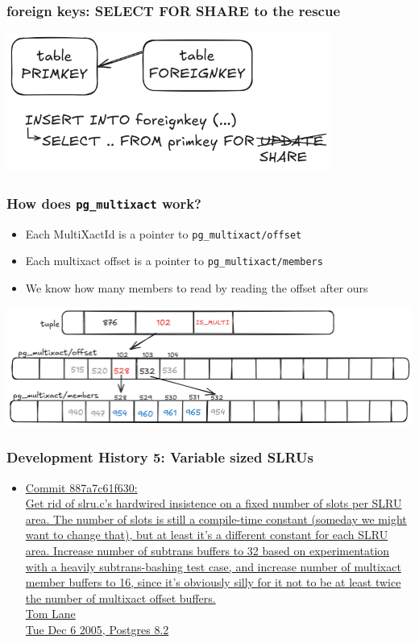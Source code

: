 \begin{frame}
  \frametitle{foreign keys: SELECT FOR SHARE to the rescue}
  \includegraphics[width=0.8\textwidth]{select-for-share.png}
\end{frame}

\begin{frame}
  \frametitle{How does \texttt{pg\_multixact} work?}
  \begin{itemize}
    \item Each MultiXactId is a pointer to \texttt{pg\_multixact/offset}
    \item Each multixact offset is a pointer to \texttt{pg\_multixact/members}
    \item We know how many members to read by reading the offset after ours
  \end{itemize}

  \includegraphics[width=\textwidth]{multixact.png}
\end{frame}

\begin{frame}
  \frametitle{Development History 5: Variable sized SLRUs}
  \begin{itemize}
    \item {\linksize \href{https://git.postgresql.org/cgit/postgresql.git/commit/?id=887a7c61f630}
      {Commit 887a7c61f630: \faExternalLink \\
      Get rid of slru.c's hardwired insistence on a fixed number of slots per
      SLRU area.  \alert<3>{The number of slots is still a compile-time constant (someday
      we might want to change that)}, but at least it's a different constant for
      each SLRU area.  \alert<2>{Increase number of subtrans buffers to 32 based on
      experimentation with a heavily subtrans-bashing test case, and increase
      number of multixact member buffers to 16, since it's obviously silly for
      it not to be at least twice the number of multixact offset buffers.} \\
      Tom Lane \\
      Tue Dec 6 2005, Postgres 8.2}}
  \end{itemize}
\end{frame}

